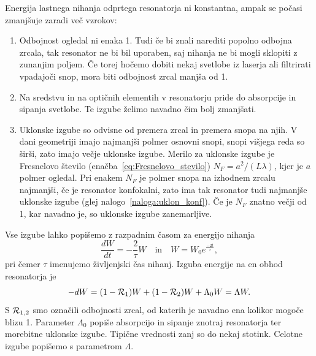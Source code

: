 Energija lastnega nihanja odprtega resonatorja ni konstantna, ampak se počasi
zmanjšuje zaradi več vzrokov:\\
\begin{enumerate}
\item Odbojnost ogledal ni enaka 1. Tudi če bi znali narediti popolno odbojna zrcala, 
tak resonator ne bi bil uporaben, saj nihanja ne bi mogli sklopiti z zunanjim poljem. Če 
torej hočemo dobiti nekaj svetlobe iz laserja ali filtrirati vpadajoči
snop, mora biti odbojnost zrcal manjša od 1.\\
\item Na sredstvu in na optičnih elementih v resonatorju pride do absorpcije in
sipanja svetlobe. Te izgube želimo navadno čim bolj zmanjšati.\\
\item Uklonske izgube so odvisne od premera zrcal in premera snopa na njih.
V dani geometriji imajo najmanjši polmer osnovni snopi, snopi višjega
reda so širši, zato imajo večje uklonske izgube. Merilo za uklonske
izgube je Fresnelovo število (enačba~\ref{eq:Fresnelovo_stevilo}) $N_{F}=a^{2}/(L\lambda)$, kjer je $a$ polmer ogledal. Pri enakem $N_{F}$ je
polmer snopa na izhodnem zrcalu najmanjši, če je resonator konfokalni, 
zato ima tak resonator tudi najmanjše uklonske izgube (glej nalogo~\ref{naloga:uklon_konf}).
Če je $N_{F}$ znatno večji od 1, kar navadno je, so uklonske izgube zanemarljive. \\
\end{enumerate}

\noindent
Vse izgube lahko popišemo z razpadnim časom za energijo nihanja 
\begin{equation}
\frac{dW}{dt}=-\frac{2}{\tau}W \quad \textrm{in} \quad W = W_0 e^{\frac{-2t}{\tau}},
\label{eq:dW}
\end{equation}
pri čemer $\tau$ imenujemo življenjski čas nihanj.
Izguba energije na en obhod resonatorja je
\begin{equation}
-dW = (1-{\cal R}_{1})W+(1-{\cal R}_{2})W +\Lambda_{0} W = \Lambda W.
\label{eq:Lambda}
\end{equation}
S ${\cal R}_{1,2}$ smo označili odbojnosti zrcal, od katerih je navadno ena
kolikor mogoče blizu 1. Parameter $\Lambda_{0}$ popiše absorpcijo in
sipanje znotraj resonatorja ter morebitne uklonske izgube. Tipične vrednosti 
zanj so do nekaj stotink. Celotne izgube popišemo s parametrom $\Lambda$. 

